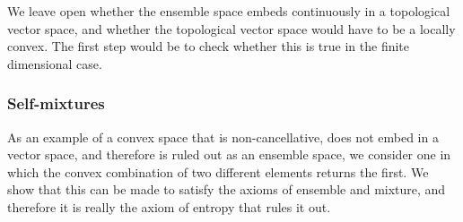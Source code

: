 We leave open whether the ensemble space embeds continuously in a topological vector space, and whether the topological vector space would have to be a locally convex. The first step would be to check whether this is true in the finite dimensional case.



\subsubsection{Self-mixtures}

As an example of a convex space that is non-cancellative, does not embed in a vector space, and therefore is ruled out as an ensemble space, we consider one in which the convex combination of two different elements returns the first. We show that this can be made to satisfy the axioms of ensemble and mixture, and therefore it is really the axiom of entropy that rules it out.

